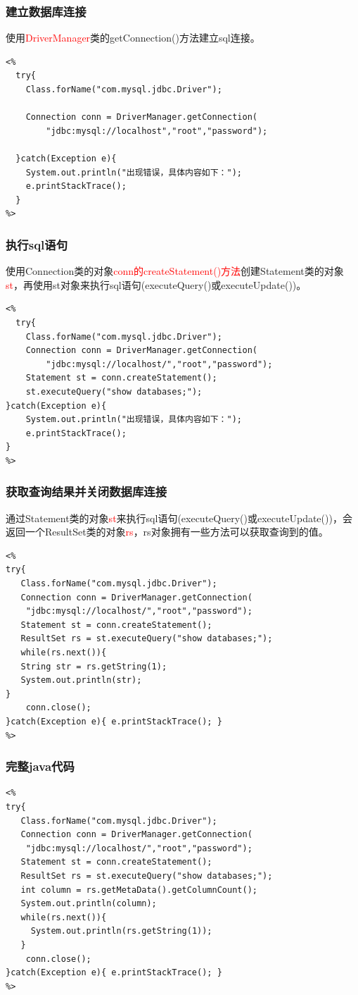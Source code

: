\documentclass{beamer}
\begin{document}
\begin{frame}[fragile]
\frametitle{建立数据库连接}
使用\textcolor{red}{DriverManager}类的getConnection()方法建立sql连接。
\begin{lstlisting}
<%
  try{
    Class.forName("com.mysql.jdbc.Driver");
    
    Connection conn = DriverManager.getConnection(
        "jdbc:mysql://localhost","root","password");
  
  }catch(Exception e){
    System.out.println("出现错误，具体内容如下：");
    e.printStackTrace();
  }
%>
\end{lstlisting}
\end{frame}


\begin{frame}[fragile]
\frametitle{执行sql语句}
使用Connection类的对象\textcolor{red}{conn的createStatement()方法}创建Statement类的对象\textcolor{red}{st}，再使用st对象来执行sql语句(executeQuery()或executeUpdate())。
\begin{lstlisting}
<%
  try{
    Class.forName("com.mysql.jdbc.Driver");
    Connection conn = DriverManager.getConnection(
        "jdbc:mysql://localhost/","root","password");
    Statement st = conn.createStatement();
    st.executeQuery("show databases;");
}catch(Exception e){
    System.out.println("出现错误，具体内容如下：");
    e.printStackTrace();
}
%>
\end{lstlisting}
\end{frame}


\begin{frame}[fragile]
\frametitle{获取查询结果并关闭数据库连接}
通过Statement类的对象\textcolor{red}{st}来执行sql语句(executeQuery()或executeUpdate())，会返回一个ResultSet类的对象\textcolor{red}{rs}，rs对象拥有一些方法可以获取查询到的值。
\begin{lstlisting}
<%
try{	
   Class.forName("com.mysql.jdbc.Driver");
   Connection conn = DriverManager.getConnection(
    "jdbc:mysql://localhost/","root","password");
   Statement st = conn.createStatement();
   ResultSet rs = st.executeQuery("show databases;");
   while(rs.next()){
   String str = rs.getString(1);
   System.out.println(str);
}
    conn.close();
}catch(Exception e){ e.printStackTrace(); }
%>
\end{lstlisting}
\end{frame}


\begin{frame}[fragile]
\frametitle{完整java代码}
\begin{lstlisting}
<%
try{
   Class.forName("com.mysql.jdbc.Driver");
   Connection conn = DriverManager.getConnection(
    "jdbc:mysql://localhost/","root","password");
   Statement st = conn.createStatement();
   ResultSet rs = st.executeQuery("show databases;");
   int column = rs.getMetaData().getColumnCount();
   System.out.println(column);
   while(rs.next()){
     System.out.println(rs.getString(1));
   }
    conn.close();
}catch(Exception e){ e.printStackTrace(); }
%>
\end{lstlisting}
\end{frame}
\end{document}
